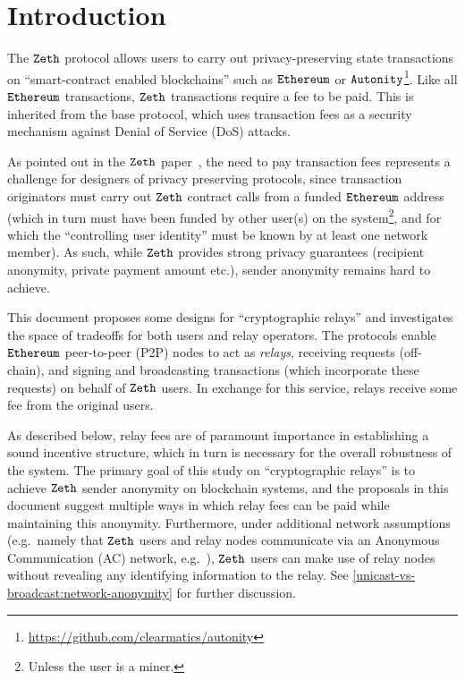 \section{Introduction}\label{preliminaries:introduction}

The $\texttt{Zeth}$ protocol allows users to carry out privacy-preserving state transactions on ``smart-contract enabled blockchains'' such as $\texttt{Ethereum}$ or $\texttt{Autonity}$\footnote{\url{https://github.com/clearmatics/autonity}}. Like all $\texttt{Ethereum}$ transactions, $\texttt{Zeth}$ transactions require a fee to be paid. This is inherited from the base protocol, which uses transaction fees as a security mechanism against Denial of Service (DoS) attacks.

As pointed out in the $\texttt{Zeth}$ paper~\cite{zethpaper}, the need to pay transaction fees represents a challenge for designers of privacy preserving protocols, since transaction originators must carry out $\texttt{Zeth}$ contract calls from a funded $\texttt{Ethereum}$ address (which in turn must have been funded by other user(s) on the system\footnote{Unless the user is a miner.}, and for which the ``controlling user identity'' must be known by at least one network member). As such, while $\texttt{Zeth}$ provides strong privacy guarantees (recipient anonymity, private payment amount etc.), sender anonymity remains hard to achieve.

This document proposes some designs for ``cryptographic relays'' and investigates the space of tradeoffs for both users and relay operators. The protocols enable $\texttt{Ethereum}$ peer-to-peer (P2P) nodes to act as \emph{relays}, receiving requests (off-chain), and signing and broadcasting transactions (which incorporate these requests) on behalf of $\texttt{Zeth}$ users. In exchange for this service, relays receive some fee from the original users.

As described below, relay fees are of paramount importance in establishing a sound incentive structure, which in turn is necessary for the overall robustness of the system. The primary goal of this study on ``cryptographic relays'' is to achieve $\texttt{Zeth}$ sender anonymity on blockchain systems, and the proposals in this document suggest multiple ways in which relay fees can be paid while maintaining this anonymity. Furthermore, under additional network assumptions (e.g.~namely that $\texttt{Zeth}$ users and relay nodes communicate via an Anonymous Communication (AC) network, e.g.~\cite{DBLP:conf/uss/PiotrowskaHEMD17}), $\texttt{Zeth}$ users can make use of relay nodes without revealing any identifying information to the relay. See \cref{unicast-vs-broadcast:network-anonymity} for further discussion.

